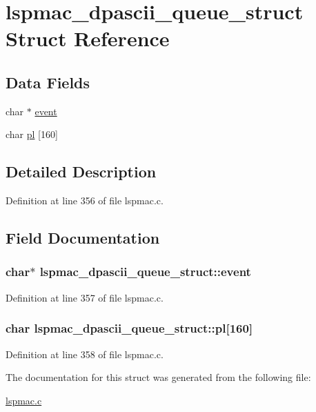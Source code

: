 \hypertarget{structlspmac__dpascii__queue__struct}{\section{lspmac\-\_\-dpascii\-\_\-queue\-\_\-struct Struct Reference}
\label{structlspmac__dpascii__queue__struct}
}
\subsection*{Data Fields}
\begin{DoxyCompactItemize}
\item 
char $\ast$ \hyperlink{structlspmac__dpascii__queue__struct_a8775c09713a917f4ddd80a3a5a8a4668}{event}
\item 
char \hyperlink{structlspmac__dpascii__queue__struct_a318d65317b14eba9e38efd0ab0133a5c}{pl} \mbox{[}160\mbox{]}
\end{DoxyCompactItemize}


\subsection{Detailed Description}


Definition at line 356 of file lspmac.\-c.



\subsection{Field Documentation}
\hypertarget{structlspmac__dpascii__queue__struct_a8775c09713a917f4ddd80a3a5a8a4668}{
\subsubsection[{event}]{\setlength{\rightskip}{0pt plus 5cm}char$\ast$ lspmac\-\_\-dpascii\-\_\-queue\-\_\-struct\-::event}}\label{structlspmac__dpascii__queue__struct_a8775c09713a917f4ddd80a3a5a8a4668}


Definition at line 357 of file lspmac.\-c.

\hypertarget{structlspmac__dpascii__queue__struct_a318d65317b14eba9e38efd0ab0133a5c}{
\subsubsection[{pl}]{\setlength{\rightskip}{0pt plus 5cm}char lspmac\-\_\-dpascii\-\_\-queue\-\_\-struct\-::pl\mbox{[}160\mbox{]}}}\label{structlspmac__dpascii__queue__struct_a318d65317b14eba9e38efd0ab0133a5c}


Definition at line 358 of file lspmac.\-c.



The documentation for this struct was generated from the following file\-:\begin{DoxyCompactItemize}
\item 
\hyperlink{lspmac_8c}{lspmac.\-c}\end{DoxyCompactItemize}
